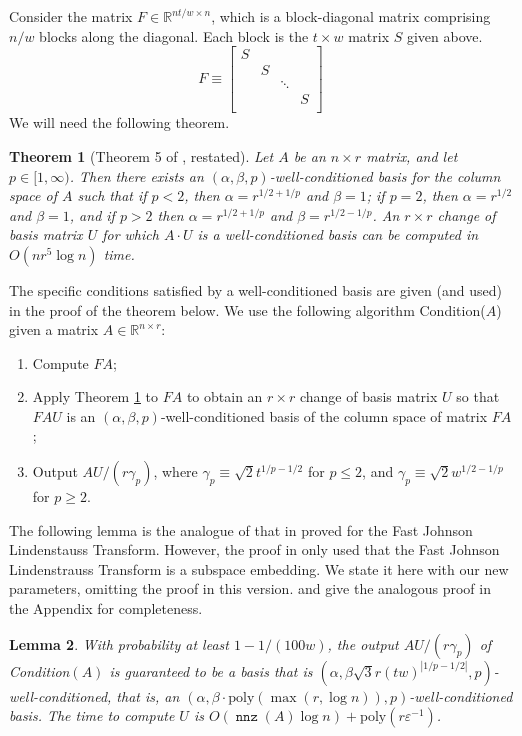 \documentclass{sig-alternate}
\DeclareMathOperator{\nnz}{\mathtt{nnz}}
\newcommand{\poly}{{\mathrm{poly}}}
\newcommand{\eps}{\varepsilon}
\newcommand{\R}{{\mathbb R}}
\newtheorem{theorem}{Theorem}
\newtheorem{lemma}[theorem]{Lemma}
\begin{document}
Consider the matrix
$F \in\R^{nt/w \times n}$, which 
is a block-diagonal matrix comprising $n/w$ blocks along the diagonal.
Each block is the $t \times w$ matrix $S$ given above. 
\[
F \equiv \left[
\begin{matrix}
S & &\\
& S &&\\
&& \ddots & \\
&&& S \\
\end{matrix}
\right]
\]
We will need the following theorem.
\begin{theorem}[Theorem 5 of \cite{ddhkm09}, restated]
\label{thm:basisOld}
Let $A$ be an $n \times r$ matrix, and let $p \in [1, \infty)$.
Then there exists an $(\alpha, \beta, p)$-well-conditioned basis for
the column space of $A$ such that if $p < 2$, then $\alpha = r^{1/2 + 1/p}$ and $\beta = 1$; 
if $p = 2$, then $\alpha = r^{1/2}$ and $\beta = 1$, and if $p > 2$ then 
$\alpha = r^{1/2 + 1/p}$ and $\beta = r^{1/2 - 1/p}$. An $r \times r$ change of basis matrix
$U$ for which $A \cdot U$ is a well-conditioned basis can be
computed in $O(nr^5 \log n)$ time. 
\end{theorem}
\noindent
The specific conditions satisfied by a well-conditioned basis are given (and used)
in the proof of the theorem below. We use the following algorithm {\sf Condition}($A$) 
given a matrix $A \in \mathbb{R}^{n \times r}$:
\begin{enumerate}
\item Compute $FA$;
\item Apply Theorem \ref{thm:basisOld} to $FA$ to obtain an $r \times r$ change of basis
matrix $U$ so that $FAU$ is an $(\alpha, \beta, p)$-well-conditioned basis of the
column space of matrix $FA$;
\item Output $AU/(r\gamma_p)$,
where $\gamma_p \equiv \sqrt{2} t^{1/p-1/2}$ for $p\le 2$,
and $\gamma_p \equiv \sqrt{2} w^{1/2-1/p}$ for $p\ge 2$.
\end{enumerate}
The following lemma is the analogue of that in \cite{CDMMMW} proved for the Fast Johnson Lindenstauss
Transform. However, the proof in \cite{CDMMMW} only used that the Fast Johnson Lindenstrauss Transform is a subspace
embedding. We state it here with our new parameters,
\ifSTOC
omitting the proof in this version.
\else and give the analogous proof in the Appendix for completeness.
\fi \begin{lemma}\label{lem:lpl2}
With probability at least $1-1/(100w)$, the output $A U/(r\gamma_p)$ of {\sf Condition}$(A)$
is guaranteed to be a basis that is $(\alpha, \beta \sqrt{3} r (tw)^{|1/p-1/2|} , p)$-well-conditioned,
that is, an $(\alpha, \beta \cdot \poly(\max(r, \log n)) , p)$-well-conditioned basis.
The time to compute $U$ is $O(\nnz(A) \log n) + \poly(r \eps^{-1})$. 
\end{lemma}
\end{document}

